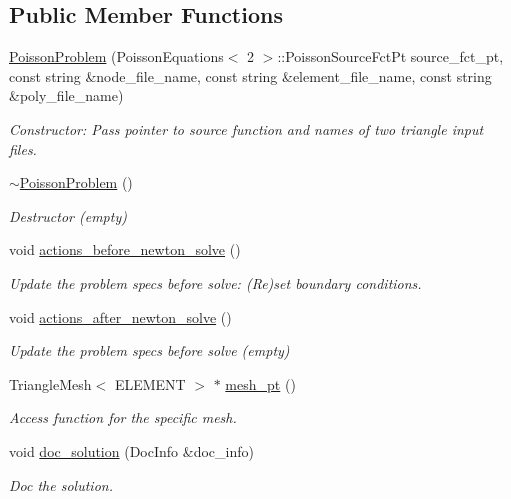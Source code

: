 \subsection*{Public Member Functions}
\begin{DoxyCompactItemize}
\item 
\hyperlink{classPoissonProblem_a80765a4c029f9659b631a80c583b58cc}{Poisson\+Problem} (Poisson\+Equations$<$ 2 $>$\+::Poisson\+Source\+Fct\+Pt source\+\_\+fct\+\_\+pt, const string \&node\+\_\+file\+\_\+name, const string \&element\+\_\+file\+\_\+name, const string \&poly\+\_\+file\+\_\+name)
\begin{DoxyCompactList}\small\item\em Constructor\+: Pass pointer to source function and names of two triangle input files. \end{DoxyCompactList}\item 
\hyperlink{classPoissonProblem_ac247e42d2d292200617f4b9db7ed1ab8}{$\sim$\+Poisson\+Problem} ()
\begin{DoxyCompactList}\small\item\em Destructor (empty) \end{DoxyCompactList}\item 
void \hyperlink{classPoissonProblem_a398608a5ff73b74c5a387b3f794c58df}{actions\+\_\+before\+\_\+newton\+\_\+solve} ()
\begin{DoxyCompactList}\small\item\em Update the problem specs before solve\+: (Re)set boundary conditions. \end{DoxyCompactList}\item 
void \hyperlink{classPoissonProblem_a7a9478d8e1e5c7d3a886b00ab7d50bbd}{actions\+\_\+after\+\_\+newton\+\_\+solve} ()
\begin{DoxyCompactList}\small\item\em Update the problem specs before solve (empty) \end{DoxyCompactList}\item 
Triangle\+Mesh$<$ E\+L\+E\+M\+E\+NT $>$ $\ast$ \hyperlink{classPoissonProblem_ad428aa9392108f968db64534fc23ba86}{mesh\+\_\+pt} ()
\begin{DoxyCompactList}\small\item\em Access function for the specific mesh. \end{DoxyCompactList}\item 
void \hyperlink{classPoissonProblem_aab6f503fa242f687bb8452527bb7688f}{doc\+\_\+solution} (Doc\+Info \&doc\+\_\+info)
\begin{DoxyCompactList}\small\item\em Doc the solution. \end{DoxyCompactList}\end{DoxyCompactItemize}
